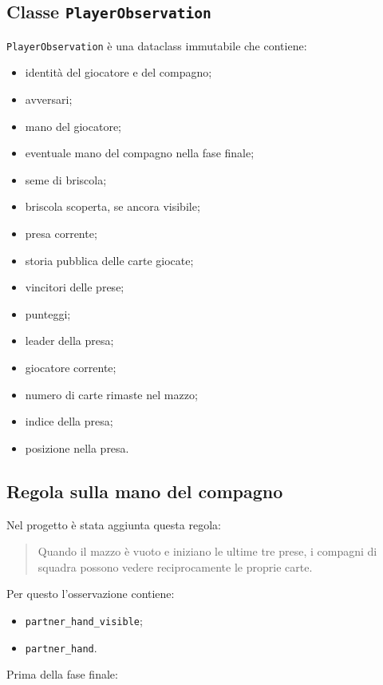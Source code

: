 \documentclass[11pt,a4paper]{article}
\begin{document}
\subsection{Classe \texttt{PlayerObservation}}

\texttt{PlayerObservation} è una dataclass immutabile che contiene:

\begin{itemize}
  \item identità del giocatore e del compagno;
  \item avversari;
  \item mano del giocatore;
  \item eventuale mano del compagno nella fase finale;
  \item seme di briscola;
  \item briscola scoperta, se ancora visibile;
  \item presa corrente;
  \item storia pubblica delle carte giocate;
  \item vincitori delle prese;
  \item punteggi;
  \item leader della presa;
  \item giocatore corrente;
  \item numero di carte rimaste nel mazzo;
  \item indice della presa;
  \item posizione nella presa.
\end{itemize}

\subsection{Regola sulla mano del compagno}

Nel progetto è stata aggiunta questa regola:

\begin{quote}
Quando il mazzo è vuoto e iniziano le ultime tre prese, i compagni di squadra
possono vedere reciprocamente le proprie carte.
\end{quote}

Per questo l'osservazione contiene:

\begin{itemize}
  \item \texttt{partner\_hand\_visible};
  \item \texttt{partner\_hand}.
\end{itemize}

Prima della fase finale:
\end{document}
